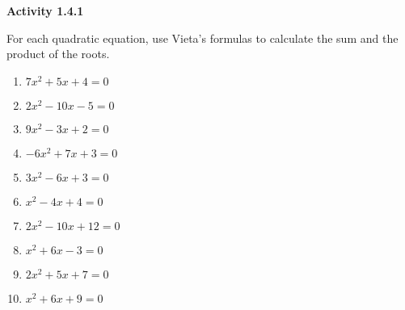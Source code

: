\vspace{1ex}
\noindent\textbf{Activity 1.4.1}

\vspace{0.75ex}

For each quadratic equation, use Vieta's formulas to calculate the sum and the product of the roots.

\begin{multicols}{2}
\begin{enumerate}[label = \color{blue}\arabic*. ]
   \item $ 7x^2 + 5x + 4 = 0 $
   \item $ 2x^2 - 10x - 5 = 0 $
   \item $ 9x^2 - 3x + 2 = 0 $
   \item $ -6x^2 + 7x + 3 = 0 $
   \item $ 3x^2 - 6x + 3 = 0 $
   \item $ x^2 - 4x + 4 = 0 $
   \item $ 2x^2 - 10x + 12 = 0 $
   \item $ x^2 + 6x - 3 = 0 $
   \item $ 2x^2 + 5x + 7 = 0 $
  \item $ x^2 + 6x + 9 = 0 $
\end{enumerate}
\end{multicols} 